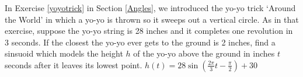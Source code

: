 { In Exercise \ref{yoyotrick} in Section \ref{Angles}, we introduced the yo-yo trick `Around the World' in which a yo-yo is thrown so it sweeps out a vertical circle.  As in that exercise, suppose the yo-yo string is 28 inches and it completes one revolution in 3 seconds.  If the closest the yo-yo ever gets to the ground is 2 inches, find a sinsuoid which models the height $h$ of the yo-yo above the ground in inches $t$ seconds after it leaves its lowest point.}
{$h(t) = 28\sin\left(\frac{2\pi}{3} t - \frac{\pi}{2}\right) + 30$}
